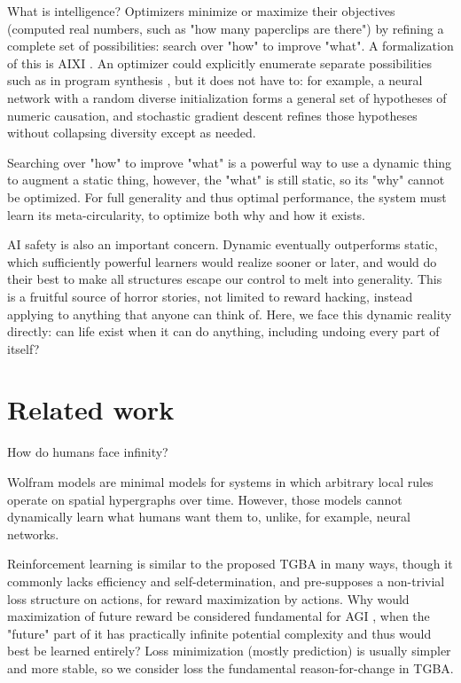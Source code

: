 \documentclass{article}
\begin{document}
What is intelligence? Optimizers minimize or maximize their objectives (computed real numbers, such as "how many paperclips are there") by refining a complete set of possibilities: search over "how" to improve "what". A formalization of this is AIXI \cite{DBLP:journals/corr/cs-AI-0004001}. An optimizer could explicitly enumerate separate possibilities such as in program synthesis \cite{ellis2020dreamcoder}, but it does not have to: for example, a neural network with a random diverse initialization \cite{mellor2021neural} forms a general set of hypotheses of numeric causation, and stochastic gradient descent refines those hypotheses without collapsing diversity except as needed.

Searching over "how" to improve "what" is a powerful way to use a dynamic thing to augment a static thing, however, the "what" is still static, so its "why" cannot be optimized. For full generality and thus optimal performance, the system must learn its meta-circularity, to optimize both why and how it exists.

AI safety is also an important concern. Dynamic eventually outperforms static, which sufficiently powerful learners would realize sooner or later, and would do their best to make all structures escape our control to melt into generality. This is a fruitful source of horror stories, not limited to reward hacking, instead applying to anything that anyone can think of. Here, we face this dynamic reality directly: can life exist when it can do anything, including undoing every part of itself?

\section{Related work}

How do humans face infinity?

Wolfram models \cite{Wolfram_2020} are minimal models for systems in which arbitrary local rules operate on spatial hypergraphs over time. However, those models cannot dynamically learn what humans want them to, unlike, for example, neural networks.

Reinforcement learning is similar to the proposed TGBA in many ways, though it commonly lacks efficiency and self-determination, and pre-supposes a non-trivial loss structure on actions, for reward maximization by actions. Why would maximization of future reward be considered fundamental for AGI \cite{SILVER2021103535}, when the "future" part of it has practically infinite potential complexity and thus would best be learned entirely? Loss minimization (mostly prediction) is usually simpler and more stable, so we consider loss the fundamental reason-for-change in TGBA.
\end{document}
